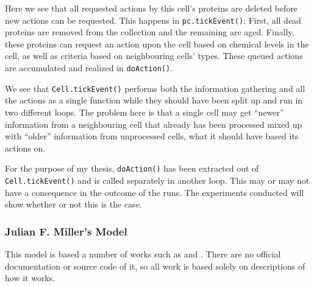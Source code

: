 Here we see that all requested actions by this cell's proteins are deleted before new actions can be requested. This happens in \texttt{pc.tickEvent()}: First, all dead proteins are removed from the collection and the remaining are aged. Finally, these proteins can request an action upon the cell based on chemical levels in the cell, as well as criteria based on neighbouring cells' types. These queued actions are accumulated and realized in \texttt{doAction()}.

We see that \texttt{Cell.tickEvent()} performs both the information gathering and all the actions as a single function while they should have been split up and run in two different loops. The problem here is that a single cell may get ``newer'' information from a neighbouring cell that already has been processed mixed up with ``older'' information from unprocessed cells, what it should have based its actions on.

For the purpose of my thesis, \texttt{doAction()} has been extracted out of \texttt{Cell.tickEvent()} and is called separately in another loop. This may or may not have a consequence in the outcome of the runs. The experiments conducted will show whether or not this is the case.


\subsubsection{Julian F. Miller's Model}
This model is based a number of works such as \cite{mteurogp2000} and \cite{ecal2003}. There are no official documentation or source code of it, so all work is based solely on descriptions of how it works.
